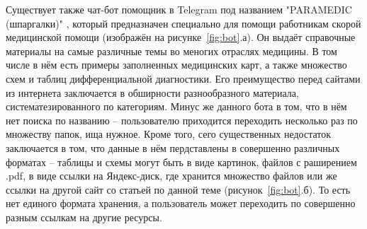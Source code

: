 Существует также чат-бот помощник в Telegram под названием "PARAMEDIC (шпаргалки)" \cite{paramedic}, который предназначен специально для помощи работникам скорой медицинской помощи (изображён на рисунке~\ref{fig:bot}.а).  Он выдаёт справочные материалы на самые различные темы во меногих отраслях медицины. В том числе в нём есть примеры заполненных медицинских карт, а также множество схем и таблиц дифференциальной диагностики. Его преимущество перед сайтами из интернета заключается в обширности разнообразного материала, систематезированного по категориям. Минус же данного бота в том, что в нём нет поиска по названию --  пользователю приходится переходить несколько раз по множеству папок, ища нужное. Кроме того, сего существенных недостаток заключается в том, что данные в нём пердставлены в совершенно различных форматах -- таблицы и схемы могут быть в виде картинок, файлов с раширением .pdf, в виде ссылки на Яндекс-диск, где хранится множество файлов или же ссылки на другой сайт со статьей по данной теме (рисунок~\ref{fig:bot}.б). То есть нет единого формата хранения, а пользователь может переходить по совершенно разным ссылкам на другие ресурсы. 

